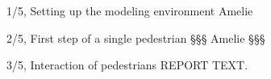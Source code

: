 \documentclass[10pt,a4paper]{article}
\begin{document}
\frontpage

\begin{task}{1/5, Setting up the modeling environment}
Amelie
\end{task}

\begin{task}{2/5, First step of a single pedestrian}
§§§
Amelie \newline
§§§


\end{task}

\begin{task}{3/5, Interaction of pedestrians}
REPORT TEXT.
\end{task}

\vfill\eject
\end{document}
